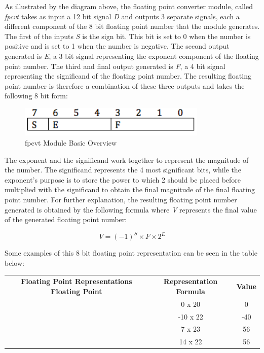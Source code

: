 \documentclass{article}
\begin{document}
As illustrated by the diagram above, the floating point converter module, called \textit{fpcvt} takes as input a 12 bit signal \textit{D} and outputs 3 separate signals, each a different component of the 8 bit floating point number that the module generates.  The first of the inputs \textit{S} is the sign bit. This bit is set to 0 when the number is positive and is set to 1 when the number is negative.  The second output generated is \textit{E}, a 3 bit signal representing the exponent component of the floating point number.  The third and final output generated is \textit{F}, a 4 bit signal representing the significand of the floating point number.  The resulting floating point number is therefore a combination of these three outputs and takes the following 8 bit form:

\begin{figure}[H]
\begin{center}
\includegraphics[width=0.8\textwidth]{floatingPointRep.png} 
\caption{fpcvt Module Basic Overview}
\end{center}
\end{figure}

The exponent and the significand work together to represent the magnitude of the number.  The significand represents the 4 most significant bits, while the exponent's purpose is to store the power to which 2 should be placed before multiplied with the significand to obtain the final magnitude of the final floating point number.  For further explanation, the resulting floating point number generated is obtained by the following formula where \textit{V} represents the final value of the generated floating point number: 

\begin{center}
\[ V  =  (-1)^S \times F \times 2^E \]
\end{center}

Some examples of this 8 bit floating point representation can be seen in the table below:

\begin{center}
\begin{tabular}{ c c c }

\textbf{Floating Point Representations}
 \textbf{Floating Point} & \textbf{Representation Formula} & \textbf{Value} \\ 
\big[0 000 0000\big] & 0 x 20 & 0\\  
\big[1 010 1010\big]  & -10 x 22 & -40 \\
\big[0 011 0111\big] & 7 x 23 & 56\\
\big[0 010 1110\big] & 14 x 22 & 56\\

\end{tabular}
\end{center}
\end{document}
